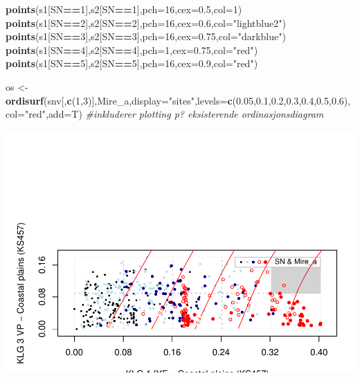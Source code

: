 \documentclass[]{article}
\newenvironment{Shaded}{\begin{snugshade}}{\end{snugshade}}
\newcommand{\CommentTok}[1]{\textcolor[rgb]{0.56,0.35,0.01}{\textit{#1}}}
\newcommand{\DataTypeTok}[1]{\textcolor[rgb]{0.13,0.29,0.53}{#1}}
\newcommand{\DecValTok}[1]{\textcolor[rgb]{0.00,0.00,0.81}{#1}}
\newcommand{\FloatTok}[1]{\textcolor[rgb]{0.00,0.00,0.81}{#1}}
\newcommand{\KeywordTok}[1]{\textcolor[rgb]{0.13,0.29,0.53}{\textbf{#1}}}
\newcommand{\NormalTok}[1]{#1}
\newcommand{\OperatorTok}[1]{\textcolor[rgb]{0.81,0.36,0.00}{\textbf{#1}}}
\newcommand{\StringTok}[1]{\textcolor[rgb]{0.31,0.60,0.02}{#1}}
\begin{document}
\begin{Shaded}
\begin{Highlighting}[]
\KeywordTok{points}\NormalTok{(s1[SN}\OperatorTok{==}\DecValTok{1}\NormalTok{],s2[SN}\OperatorTok{==}\DecValTok{1}\NormalTok{],}\DataTypeTok{pch=}\DecValTok{16}\NormalTok{,}\DataTypeTok{cex=}\FloatTok{0.5}\NormalTok{,}\DataTypeTok{col=}\DecValTok{1}\NormalTok{)}
\KeywordTok{points}\NormalTok{(s1[SN}\OperatorTok{==}\DecValTok{2}\NormalTok{],s2[SN}\OperatorTok{==}\DecValTok{2}\NormalTok{],}\DataTypeTok{pch=}\DecValTok{16}\NormalTok{,}\DataTypeTok{cex=}\FloatTok{0.6}\NormalTok{,}\DataTypeTok{col=}\StringTok{"lightblue2"}\NormalTok{)}
\KeywordTok{points}\NormalTok{(s1[SN}\OperatorTok{==}\DecValTok{3}\NormalTok{],s2[SN}\OperatorTok{==}\DecValTok{3}\NormalTok{],}\DataTypeTok{pch=}\DecValTok{16}\NormalTok{,}\DataTypeTok{cex=}\FloatTok{0.75}\NormalTok{,}\DataTypeTok{col=}\StringTok{"darkblue"}\NormalTok{)}
\KeywordTok{points}\NormalTok{(s1[SN}\OperatorTok{==}\DecValTok{4}\NormalTok{],s2[SN}\OperatorTok{==}\DecValTok{4}\NormalTok{],}\DataTypeTok{pch=}\DecValTok{1}\NormalTok{,}\DataTypeTok{cex=}\FloatTok{0.75}\NormalTok{,}\DataTypeTok{col=}\StringTok{"red"}\NormalTok{)}
\KeywordTok{points}\NormalTok{(s1[SN}\OperatorTok{==}\DecValTok{5}\NormalTok{],s2[SN}\OperatorTok{==}\DecValTok{5}\NormalTok{],}\DataTypeTok{pch=}\DecValTok{16}\NormalTok{,}\DataTypeTok{cex=}\FloatTok{0.9}\NormalTok{,}\DataTypeTok{col=}\StringTok{"red"}\NormalTok{)}

\NormalTok{os <-}\StringTok{ }\KeywordTok{ordisurf}\NormalTok{(snv[,}\KeywordTok{c}\NormalTok{(}\DecValTok{1}\NormalTok{,}\DecValTok{3}\NormalTok{)],Mire_a,}\DataTypeTok{display=}\StringTok{"sites"}\NormalTok{,}\DataTypeTok{levels=}\KeywordTok{c}\NormalTok{(}\FloatTok{0.05}\NormalTok{,}\FloatTok{0.1}\NormalTok{,}\FloatTok{0.2}\NormalTok{,}\FloatTok{0.3}\NormalTok{,}\FloatTok{0.4}\NormalTok{,}\FloatTok{0.5}\NormalTok{,}\FloatTok{0.6}\NormalTok{), }\DataTypeTok{col=}\StringTok{"red"}\NormalTok{,}\DataTypeTok{add=}\NormalTok{T) }\CommentTok{#inkluderer plotting p? eksisterende ordinasjonsdiagram}
\end{Highlighting}
\end{Shaded}

\includegraphics{Landscape_analysis_example_4_files/figure-latex/unnamed-chunk-49-1.pdf}
\end{document}
